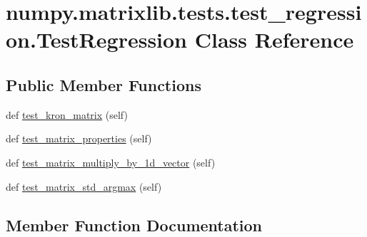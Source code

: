 \hypertarget{classnumpy_1_1matrixlib_1_1tests_1_1test__regression_1_1TestRegression}{}\section{numpy.\+matrixlib.\+tests.\+test\+\_\+regression.\+Test\+Regression Class Reference}
\label{classnumpy_1_1matrixlib_1_1tests_1_1test__regression_1_1TestRegression}
\subsection*{Public Member Functions}
\begin{DoxyCompactItemize}
\item 
def \hyperlink{classnumpy_1_1matrixlib_1_1tests_1_1test__regression_1_1TestRegression_a2937b6d8391ae3b09236c781c4bb80d1}{test\+\_\+kron\+\_\+matrix} (self)
\item 
def \hyperlink{classnumpy_1_1matrixlib_1_1tests_1_1test__regression_1_1TestRegression_a260189c12f6aee4b77b46589a97bf878}{test\+\_\+matrix\+\_\+properties} (self)
\item 
def \hyperlink{classnumpy_1_1matrixlib_1_1tests_1_1test__regression_1_1TestRegression_a751579f7fdcd8f1b55ea058656ee4f7f}{test\+\_\+matrix\+\_\+multiply\+\_\+by\+\_\+1d\+\_\+vector} (self)
\item 
def \hyperlink{classnumpy_1_1matrixlib_1_1tests_1_1test__regression_1_1TestRegression_abb8ff7079c7c6da8174fa6a820eb12ea}{test\+\_\+matrix\+\_\+std\+\_\+argmax} (self)
\end{DoxyCompactItemize}


\subsection{Member Function Documentation}
\mbox{\label{classnumpy_1_1matrixlib_1_1tests_1_1test__regression_1_1TestRegression_a2937b6d8391ae3b09236c781c4bb80d1}} 
